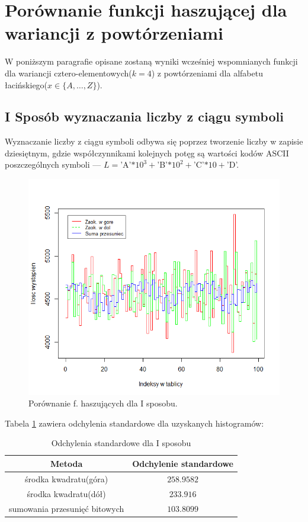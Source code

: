 \documentclass{article}
\begin{document}
\section{Porównanie funkcji haszującej dla wariancji z powtórzeniami}
	W poniższym paragrafie opisane zostaną wyniki wcześniej wspomnianych funkcji dla wariancji cztero-elementowych($k = 4$) z powtórzeniami dla alfabetu łacińskiego($x \in \{A,\ldots,Z\}$).
		\subsection{I Sposób wyznaczania liczby z ciągu symboli}\label{p2}
			Wyznaczanie liczby z ciągu symboli odbywa się poprzez tworzenie liczby w zapisie dziesiętnym, gdzie współczynnikami kolejnych potęg są wartości kodów ASCII poszczególnych symboli --- $L =$'A'$*10^3+$'B'$*10^2+$'C'$*10+$'D'.
			
			\begin{figure}[h]
				\includegraphics[width=\linewidth]{2.png}
				\caption{Porównanie f. haszujących dla I sposobu.}
			\end{figure}		
			Tabela \ref{sp1} zawiera odchylenia standardowe dla uzyskanych histogramów:
			
			\begin{table}
				\centering
				\label{sp1}
				\caption{Odchylenia standardowe dla I sposobu}
				\begin{tabular}{|c|c|}
					\hline
					Metoda & Odchylenie standardowe \\\hline\hline 
					środka kwadratu(góra)& $258.9582$ \\\hline  
					środka kwadratu(dół)	& $233.916$ \\\hline  
					sumowania przesunięć bitowych & $103.8099$\\\hline 
				\end{tabular} 
			\end{table}
						
\end{document}
